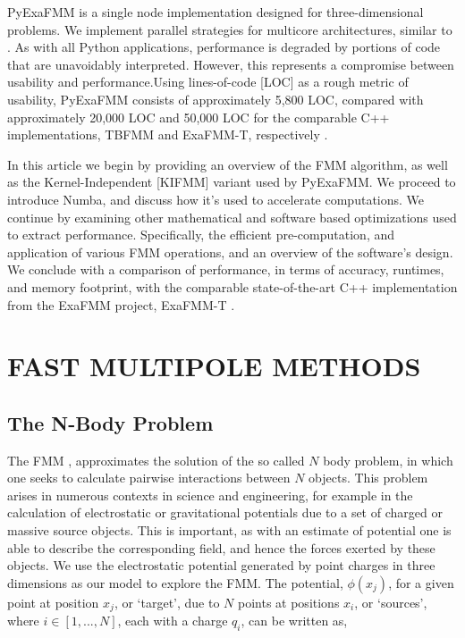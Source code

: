 \documentclass{IEEEcsmag}
\begin{document}
PyExaFMM is a single node implementation designed for three-dimensional problems. We implement parallel strategies for multicore architectures, similar to \cite{Bramas2020, Wang2021}. As with all Python applications, performance is degraded by portions of code that are unavoidably interpreted. However, this represents a compromise between usability and performance.Using lines-of-code [LOC] as a rough metric of usability, PyExaFMM consists of approximately 5,800 LOC, compared with approximately 20,000 LOC and 50,000 LOC for the comparable C++ implementations, TBFMM and ExaFMM-T, respectively \cite{Bramas2020, Wang2021}.

In this article we begin by providing an overview of the FMM algorithm, as well as the Kernel-Independent [KIFMM] variant
\cite{Ying2004} used by PyExaFMM. We proceed to introduce Numba, and discuss how it's used to accelerate computations. We continue by examining other mathematical and software based optimizations used to extract performance. Specifically, the efficient pre-computation, and application of various FMM operations, and an overview of the software's design. We conclude with a comparison of performance, in terms of accuracy, runtimes, and memory footprint, with the comparable state-of-the-art C++ implementation from the ExaFMM project, ExaFMM-T \cite{Wang2021}.

\section{FAST MULTIPOLE METHODS}

\subsection{The N-Body Problem}

The FMM \cite{Greengard1987}, approximates the solution of the so called $N$ body problem, in which one seeks to calculate pairwise interactions between $N$ objects. This problem arises in numerous contexts in science and engineering, for example in the calculation of electrostatic or gravitational potentials due to a set of charged or massive source objects. This is important, as with an estimate of potential one is able to describe the corresponding field, and hence the forces exerted by these objects. We use the electrostatic potential generated by point charges in three dimensions as our model to explore the FMM. The potential, $\phi(x_j)$, for a given point at position $x_j$, or `target', due to $N$ points at positions $x_i$, or `sources', where $i \in [1, ..., N]$, each with a charge $q_i$, can be written as,
\end{document}
